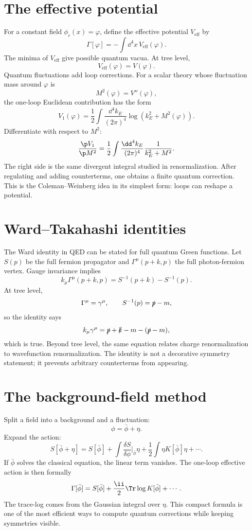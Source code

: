 \section{The effective potential}

For a constant field \(\phi_c(x)=\varphi\), define the effective potential \(V_{\text{eff}}\) by
\[
  \Gamma[\varphi]=-\int\dd^4x\,V_{\text{eff}}(\varphi).
\]
The minima of \(V_{\text{eff}}\) give possible quantum vacua.  At tree level,
\[
  V_{\text{eff}}(\varphi)=V(\varphi).
\]
Quantum fluctuations add loop corrections.  For a scalar theory whose fluctuation mass around \(\varphi\) is
\[
  M^2(\varphi)=V''(\varphi),
\]
the one-loop Euclidean contribution has the form
\[
  V_1(\varphi)=\frac12\int\frac{\dd^4k_E}{(2\pi)^4}
  \log(k_E^2+M^2(\varphi)).
\]
Differentiate with respect to \(M^2\):
\[
  \frac{\p V_1}{\p M^2}
  =
  \frac12\int\frac{\dd^4k_E}{(2\pi)^4}
  \frac1{k_E^2+M^2}.
\]
The right side is the same divergent integral studied in renormalization.  After regulating and adding counterterms, one obtains a finite quantum correction.  This is the Coleman--Weinberg idea in its simplest form: loops can reshape a potential.

\section{Ward--Takahashi identities}

The Ward identity in QED can be stated for full quantum Green functions.  Let \(S(p)\) be the full fermion propagator and \(\Gamma^\mu(p+k,p)\) the full photon-fermion vertex.  Gauge invariance implies
\[
  k_\mu\Gamma^\mu(p+k,p)=S^{-1}(p+k)-S^{-1}(p).
\]
At tree level,
\[
  \Gamma^\mu=\gamma^\mu,\qquad
  S^{-1}(p)=\slashed p-m,
\]
so the identity says
\[
  k_\mu\gamma^\mu=\slashed p+\slashed k-m-(\slashed p-m),
\]
which is true.  Beyond tree level, the same equation relates charge renormalization to wavefunction renormalization.  The identity is not a decorative symmetry statement; it prevents arbitrary counterterms from appearing.

\section{The background-field method}

Split a field into a background and a fluctuation:
\[
  \phi=\bar\phi+\eta.
\]
Expand the action:
\[
  S[\bar\phi+\eta]
  =
  S[\bar\phi]
  +
  \int\frac{\delta S}{\delta\phi}\bigg|_{\bar\phi}\eta
  +
  \frac12\int\eta K[\bar\phi]\eta+\cdots.
\]
If \(\bar\phi\) solves the classical equation, the linear term vanishes.  The one-loop effective action is then formally
\[
  \Gamma[\bar\phi]=S[\bar\phi]+\frac{\ii}{2}\Tr\log K[\bar\phi]+\cdots.
\]
The trace-log comes from the Gaussian integral over \(\eta\).  This compact formula is one of the most efficient ways to compute quantum corrections while keeping symmetries visible.

